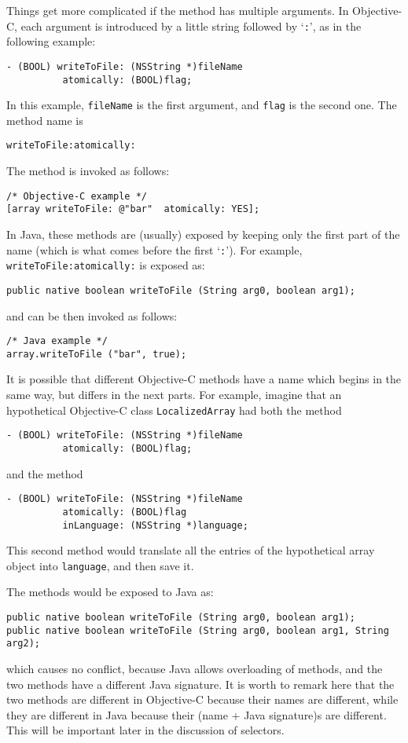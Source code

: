 Things get more complicated if the method has multiple arguments.  In
Objective-C, each argument is introduced by a little string followed
by `\texttt{:}', as in the following example:
\begin{verbatim}
- (BOOL) writeToFile: (NSString *)fileName  
          atomically: (BOOL)flag;
\end{verbatim}
In this example, \texttt{fileName} is the first argument, and
\texttt{flag} is the second one.  The method name is 
\begin{verbatim}
writeToFile:atomically:
\end{verbatim}
The method is invoked as follows:
\begin{verbatim}
/* Objective-C example */
[array writeToFile: @"bar"  atomically: YES];
\end{verbatim}

In Java, these methods are (usually) exposed by keeping only the first
part of the name (which is what comes before the first `\texttt{:}').
For example, \texttt{writeToFile:atomically:} is exposed as:
\begin{verbatim} 
public native boolean writeToFile (String arg0, boolean arg1);
\end{verbatim}
and can be then invoked as follows:
\begin{verbatim}
/* Java example */
array.writeToFile ("bar", true);
\end{verbatim}

It is possible that different Objective-C methods have a name which
begins in the same way, but differs in the next parts.  For example,
imagine that an hypothetical Objective-C class \texttt{LocalizedArray}
had both the method 
\begin{verbatim}
- (BOOL) writeToFile: (NSString *)fileName  
          atomically: (BOOL)flag;
\end{verbatim}
and the method
\begin{verbatim}
- (BOOL) writeToFile: (NSString *)fileName  
          atomically: (BOOL)flag
          inLanguage: (NSString *)language;
\end{verbatim}
This second method would translate all the entries of the hypothetical
array object into \texttt{language}, and then save it.

The methods would be exposed to Java as:
\begin{verbatim} 
public native boolean writeToFile (String arg0, boolean arg1);
public native boolean writeToFile (String arg0, boolean arg1, String arg2);
\end{verbatim}
which causes no conflict, because Java allows overloading of methods,
and the two methods have a different Java signature.  It is worth to
remark here that the two methods are different in Objective-C because
their names are different, while they are different in Java because
their (name + Java signature)s are different.  This will be important
later in the discussion of selectors.

